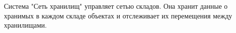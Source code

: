 Система "Сеть хранилищ" управляет сетью складов. Она хранит 
данные о хранимых в каждом складе объектах и отслеживает их 
перемещения между хранилищами.
